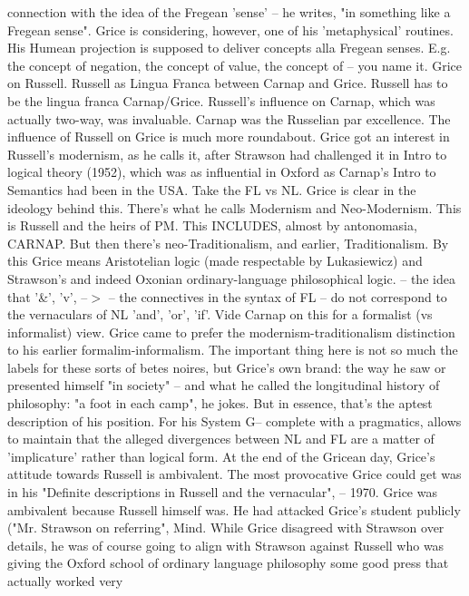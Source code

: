 \documentclass[10pt,titlepage]{book}
\begin{document}
connection with the  idea of the Fregean 'sense' -- he writes, "in something 
like a Fregean sense".  Grice is considering, however, one of his 
'metaphysical' routines. His Humean  projection is supposed to deliver concepts alla 
Fregean senses. E.g. the concept  of negation, the concept of value, the 
concept of -- you name  it. 
Grice  on Russell. Russell as Lingua Franca between Carnap and Grice. 
Russell has to be  the lingua franca Carnap/Grice. Russell's influence on Carnap, 
which was  actually two-way, was invaluable. Carnap was the Russelian par 
excellence. The  influence of Russell on Grice is much more roundabout. Grice 
got an interest in  Russell's modernism, as he calls it, after Strawson had 
challenged it in Intro  to logical theory (1952), which was as influential 
in Oxford as Carnap's Intro  to Semantics had been in the USA. Take the FL   
vs   NL.  Grice is clear in the ideology behind this. There's what he calls 
Modernism and  Neo-Modernism. This is Russell and the heirs of PM. This 
INCLUDES, almost by  antonomasia, CARNAP. But then there's neo-Traditionalism, 
and earlier,  Traditionalism. By this Grice means Aristotelian logic (made 
respectable by  Lukasiewicz) and Strawson's and indeed Oxonian 
ordinary-language philosophical  logic. 
--  the idea that '\&', 'v', --$>$ -- the connectives in the syntax of FL -- 
do  not correspond to the vernaculars of NL 'and', 'or', 'if'. Vide Carnap on 
this  for a formalist (vs informalist) view. Grice came to prefer the  
modernism-traditionalism distinction to his earlier formalim-informalism. The  
important thing here is not so much the labels for these sorts of betes 
noires,  but Grice's own brand: the way he saw or presented himself "in society" 
-- and  what he called the longitudinal history of philosophy: "a foot in 
each camp", he  jokes. But in essence, that's the aptest description of his 
position. For his  System G-- complete with a pragmatics, allows to maintain 
that the alleged  divergences between NL and FL are a matter of 
'implicature' rather than logical  form.  At the end of the Gricean  day, Grice's  
attitude towards Russell is ambivalent. The most  provocative Grice could  get 
was in his "Definite descriptions in Russell and the  
vernacular",  -- 1970. Grice was ambivalent because Russell himself was. He 
had attacked  Grice's student publicly ("Mr. Strawson on referring", Mind.  
While Grice  disagreed with Strawson over details, he was of course going 
to  align with  Strawson against Russell who was giving the Oxford school of 
ordinary   language philosophy some good press that actually worked very 
\end{document}
